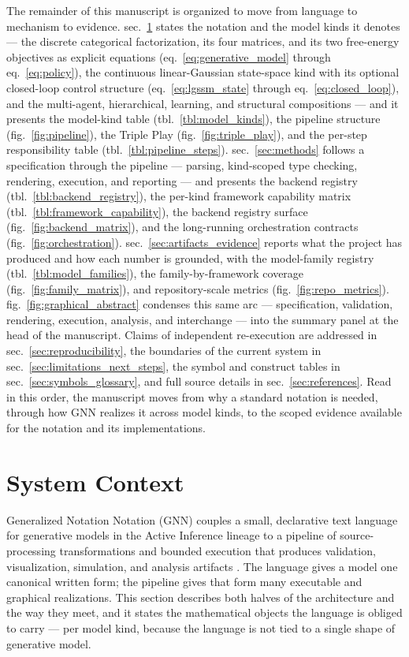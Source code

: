 \documentclass[
  english,
  9pt,
]{extarticle}
\begin{document}
The remainder of this manuscript is organized to move from language to
mechanism to evidence. sec.~\ref{sec:system_context} states the notation
and the model kinds it denotes --- the discrete categorical
factorization, its four matrices, and its two free-energy objectives as
explicit equations (eq.~\ref{eq:generative_model} through
eq.~\ref{eq:policy}), the continuous linear-Gaussian state-space kind
with its optional closed-loop control structure
(eq.~\ref{eq:lgssm_state} through eq.~\ref{eq:closed_loop}), and the
multi-agent, hierarchical, learning, and structural compositions --- and
it presents the model-kind table (tbl.~\ref{tbl:model_kinds}), the
pipeline structure (fig.~\ref{fig:pipeline}), the Triple Play
(fig.~\ref{fig:triple_play}), and the per-step responsibility table
(tbl.~\ref{tbl:pipeline_steps}). sec.~\ref{sec:methods} follows a
specification through the pipeline --- parsing, kind-scoped type
checking, rendering, execution, and reporting --- and presents the
backend registry (tbl.~\ref{tbl:backend_registry}), the per-kind
framework capability matrix (tbl.~\ref{tbl:framework_capability}), the
backend registry surface (fig.~\ref{fig:backend_matrix}), and the
long-running orchestration contracts (fig.~\ref{fig:orchestration}).
sec.~\ref{sec:artifacts_evidence} reports what the project has produced
and how each number is grounded, with the model-family registry
(tbl.~\ref{tbl:model_families}), the family-by-framework coverage
(fig.~\ref{fig:family_matrix}), and repository-scale metrics
(fig.~\ref{fig:repo_metrics}). fig.~\ref{fig:graphical_abstract}
condenses this same arc --- specification, validation, rendering,
execution, analysis, and interchange --- into the summary panel at the
head of the manuscript. Claims of independent re-execution are addressed
in sec.~\ref{sec:reproducibility}, the boundaries of the current system
in sec.~\ref{sec:limitations_next_steps}, the symbol and construct
tables in sec.~\ref{sec:symbols_glossary}, and full source details in
sec.~\ref{sec:references}. Read in this order, the manuscript moves from
why a standard notation is needed, through how GNN realizes it across
model kinds, to the scoped evidence available for the notation and its
implementations.

\newpage

\section{System Context}\label{sec:system_context}

Generalized Notation Notation (GNN) couples a small, declarative text
language for generative models in the Active Inference lineage to a
pipeline of source-processing transformations and bounded execution that
produces validation, visualization, simulation, and analysis artifacts
\citep{gnn2023}. The language gives a model one canonical written form;
the pipeline gives that form many executable and graphical realizations.
This section describes both halves of the architecture and the way they
meet, and it states the mathematical objects the language is obliged to
carry --- per model kind, because the language is not tied to a single
shape of generative model.
\end{document}
